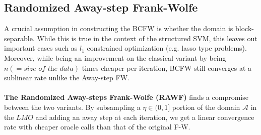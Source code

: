 \documentclass{article}
\begin{document}
\subsection{Randomized Away-step Frank-Wolfe}
A crucial assumption in constructing the BCFW is whether the domain is block-separable. While this is true in the context of the structured SVM, this leaves out important cases such as $l_{1}$ constrained optimization (e.g. lasso type problems).
\\
Moreover, while being an improvement on the classical variant by being $n(=\textit{size of the data})$ times cheaper per iteration, BCFW still converges at a sublinear rate unlike the Away-step FW.\\
\\
\textbf{The Randomized Away-steps Frank-Wolfe (RAWF)} \cite{Kerdeuxetal18} finds a compromise between the two variants. By subsampling a $\eta\in(0,1]$ portion of the domain $\mathcal{A}$ in the $LMO$ and adding an away step at each iteration, we get a linear convergence rate with cheaper oracle calls than that of the original F-W.
\end{document}
